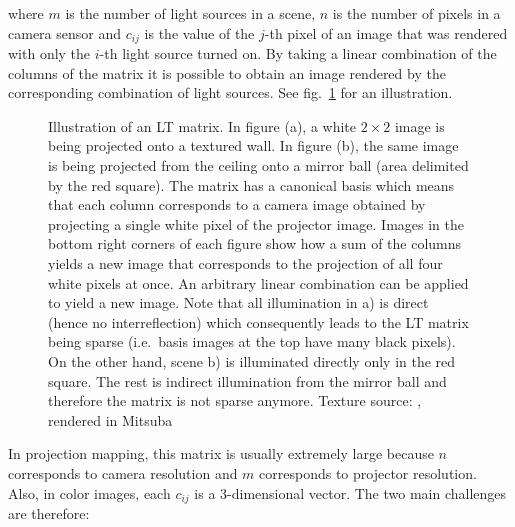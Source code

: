 where \(m\) is the number of light sources in a scene, \(n\) is the number of pixels in a camera sensor and \(c_{ij}\) is the value of the \(j\)-th pixel of an image that was rendered with only the \(i\)-th light source turned on. By taking a linear combination of the columns of the matrix it is possible to obtain an image rendered by the corresponding combination of light sources. See fig.~\ref{fig:background_lt_capture} for an illustration.

\begin{figure}[]
    \centering
    \begin{subfigure}[b]{\textwidth}
        \centering
        \def\svgwidth{\textwidth}
        
        \caption{}
    \end{subfigure}
    
    \begin{subfigure}[b]{\textwidth}
        \centering
        \def\svgwidth{\textwidth}
        
        \caption{}
    \end{subfigure}
    \caption{Illustration of an LT matrix. In figure (a), a white \(2 \times 2\) image is being projected onto a textured wall. In figure (b), the same image is being projected from the ceiling onto a mirror ball (area delimited by the red square). The matrix has a canonical basis which means that each column corresponds to a camera image obtained by projecting a single white pixel of the projector image. Images in the bottom right corners of each figure show how a sum of the columns yields a new image that corresponds to the projection of all four white pixels at once. An arbitrary linear combination can be applied to yield a new image. Note that all illumination in a) is direct (hence no interreflection) which consequently leads to the LT matrix being sparse (i.e.~basis images at the top have many black pixels). On the other hand, scene b) is illuminated directly only in the red square. The rest is indirect illumination from the mirror ball and therefore the matrix is not sparse anymore. Texture source: \citet{Pixar128}, rendered in Mitsuba}
    \label{fig:background_lt_capture}
\end{figure}

In projection mapping, this matrix is usually extremely large because \(n\) corresponds to camera resolution and \(m\) corresponds to projector resolution. Also, in color images, each \(c_{ij}\) is a 3-dimensional vector. The two main challenges are therefore:

